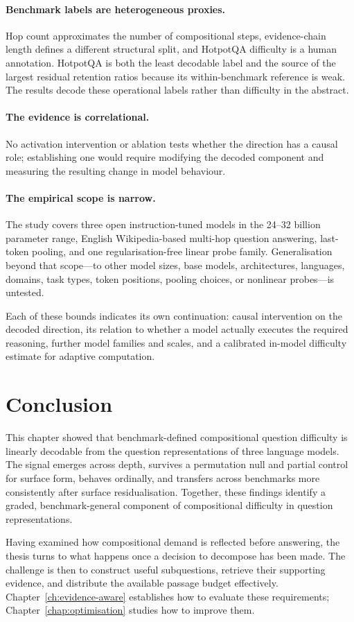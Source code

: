 \paragraph{Benchmark labels are heterogeneous proxies.}
Hop count approximates the number of compositional steps, evidence-chain length
defines a different structural split, and HotpotQA difficulty is a human
annotation. HotpotQA is both the least decodable label and the source of the
largest residual retention ratios because its within-benchmark reference is
weak. The results decode these operational labels rather than difficulty in the
abstract.

\paragraph{The evidence is correlational.}
No activation intervention or ablation tests whether the direction has a causal
role; establishing one would require modifying the decoded component and
measuring the resulting change in model behaviour.

\paragraph{The empirical scope is narrow.}
The study covers three open instruction-tuned models in the 24--32 billion
parameter range, English Wikipedia-based multi-hop question answering,
last-token pooling, and one regularisation-free linear probe family.
Generalisation beyond that scope---to other model sizes, base models,
architectures, languages, domains, task types, token positions, pooling
choices, or nonlinear probes---is untested.

Each of these bounds indicates its own continuation: causal intervention on the
decoded direction, its relation to whether a model actually executes the
required reasoning, further model families and scales, and a calibrated
in-model difficulty estimate for adaptive computation.

\section*{Conclusion}
{}

This chapter showed that benchmark-defined compositional question difficulty is
linearly decodable from the question representations of three language models.
The signal emerges across depth, survives a permutation null and partial control
for surface form, behaves ordinally, and transfers across benchmarks more
consistently after surface residualisation. Together, these findings identify
a graded, benchmark-general component of compositional difficulty in question
representations.

Having examined how compositional demand is reflected before answering,
the thesis turns to what happens once a decision to decompose has been made.
The challenge is then to construct useful subquestions, retrieve their
supporting evidence, and distribute the available passage budget effectively.
Chapter~\ref{ch:evidence-aware} establishes how to evaluate these requirements;
Chapter~\ref{chap:optimisation} studies how to improve them.
